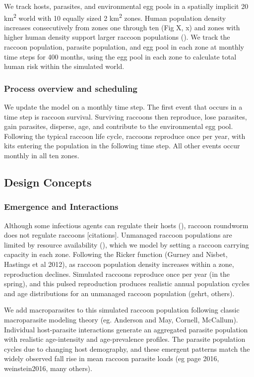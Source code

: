 \documentclass[11pt]{article}
\begin{document}
We track hosts, parasites, and environmental egg pools in a spatially
implicit 20 km\textsuperscript{2} world with 10 equally sized 2
km\textsuperscript{2} zones. Human population density increases
consecutively from zones one through ten (Fig X, x) and zones with
higher human density support larger raccoon populations (). We track the
raccoon population, parasite population, and egg pool in each zone at
monthly time steps for 400 months, using the egg pool in each zone to
calculate total human risk within the simulated world.

\subsubsection{Process overview and scheduling}

We update the model on a monthly time step. The first event that occurs in a time step is raccoon survival. Surviving raccoons then reproduce, lose
parasites, gain parasites, disperse, age, and contribute to the
environmental egg pool. Following the typical raccoon life cycle,
raccoons reproduce once per year, with kits entering the population in
the following time step. All other events occur monthly in all ten
zones.

\subsection{Design Concepts}

\subsubsection{Emergence and Interactions}

Although some infectious agents can regulate their hosts (), raccoon
roundworm does not regulate raccoons [citations]. Unmanaged raccoon populations are
limited by resource availability (), which we model by setting a raccoon
carrying capacity in each zone. Following the Ricker function (Gurney
and Nisbet, Hastings et al 2012), as raccoon population density
increases within a zone, reproduction declines. Simulated raccoons
reproduce once per year (in the spring), and this pulsed reproduction
produces realistic annual population cycles and age distributions for an
unmanaged raccoon population (gehrt, others).

We add macroparasites to this simulated raccoon population following
classic macroparasite modeling theory (eg. Anderson and May, Cornell,
McCallum). Individual host-parasite interactions generate an aggregated
parasite population with realistic age-intensity and age-prevalence
profiles. The parasite population cycles due to
changing host demography, and these emergent patterns match the widely
observed fall rise in mean raccoon parasite loads (eg page 2016,
weinstein2016, many others).
\end{document}
